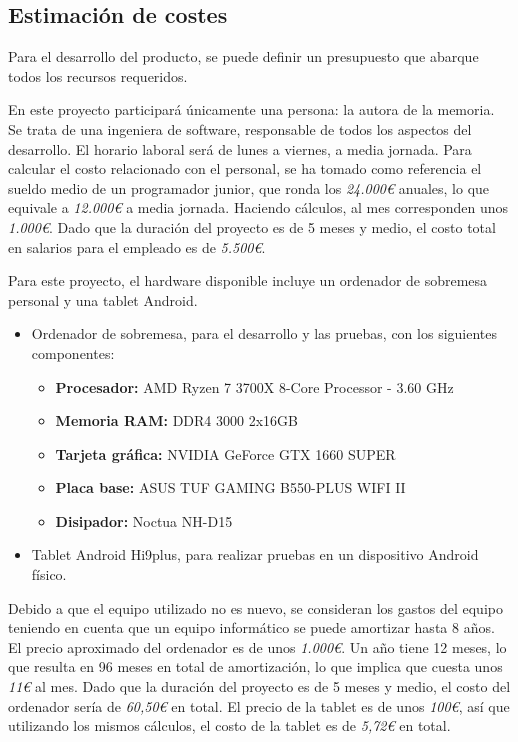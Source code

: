 \documentclass[a4paper, 12pt]{article}
\begin{document}
\newpage
\subsection{Estimación de costes}

Para el desarrollo del producto, se puede definir un presupuesto que abarque todos los recursos requeridos.

En este proyecto participará únicamente una persona: la autora de la memoria. Se trata de una ingeniera de software, responsable de todos los aspectos del desarrollo. El horario laboral será de lunes a viernes, a media jornada. Para calcular el costo relacionado con el personal, se ha tomado como referencia el sueldo medio de un programador junior, que ronda los \textit{24.000€} anuales, lo que equivale a \textit{12.000€} a media jornada. Haciendo cálculos, al mes corresponden unos \textit{1.000€}. Dado que la duración del proyecto es de 5 meses y medio, el costo total en salarios para el empleado es de \textit{5.500€}.

Para este proyecto, el hardware disponible incluye un ordenador de sobremesa personal y una tablet Android.

\begin{itemize}[noitemsep]
	\item Ordenador de sobremesa, para el desarrollo y las pruebas, con los siguientes componentes:
		\begin{itemize}[noitemsep]
			\item \textbf{Procesador:} AMD Ryzen 7 3700X 8-Core Processor - 3.60 GHz
			\item \textbf{Memoria RAM:} DDR4 3000 2x16GB
			\item \textbf{Tarjeta gráfica:} NVIDIA GeForce GTX 1660 SUPER
			\item \textbf{Placa base:} ASUS TUF GAMING B550-PLUS WIFI II
			\item \textbf{Disipador:} Noctua NH-D15
		\end{itemize}
	\item Tablet Android Hi9plus, para realizar pruebas en un dispositivo Android físico.
\end{itemize}

Debido a que el equipo utilizado no es nuevo, se consideran los gastos del equipo teniendo en cuenta que un equipo informático se puede amortizar hasta 8 años. El precio aproximado del ordenador es de unos \textit{1.000€}. Un año tiene 12 meses, lo que resulta en 96 meses en total de amortización, lo que implica que cuesta unos \textit{11€} al mes. Dado que la duración del proyecto es de 5 meses y medio, el costo del ordenador sería de \textit{60,50€} en total. El precio de la tablet es de unos \textit{100€}, así que utilizando los mismos cálculos, el costo de la tablet es de \textit{5,72€} en total.
\end{document}
